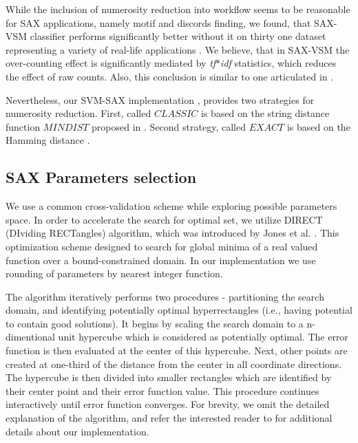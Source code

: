 \documentclass{llncs}
\begin{document}
While the inclusion of numerosity reduction into workflow seems to be reasonable for SAX
applications, namely motif and discords finding, we found, that SAX-VSM classifier performs
significantly better without it on thirty one dataset representing a variety of real-life
applications \cite{jmotif}.
We believe, that in SAX-VSM the over-counting effect is significantly mediated by
\textit{tf$\ast$idf} statistics, which reduces the effect of raw counts. Also, this conclusion is
similar to one articulated in \cite{bag_patterns}.

Nevertheless, our SVM-SAX implementation \cite{jmotif}, provides two strategies for numerosity
reduction. First, called $CLASSIC$ is based on the string distance function $MINDIST$ proposed
in \cite{streaming_sax}. Second strategy, called $EXACT$ is based on the Hamming distance
\cite{hamming}. 

\subsection{SAX Parameters selection} \label{section-direct}
We use a common cross-validation scheme while exploring possible parameters space. 
In order to accelerate the search for optimal set, 
we utilize DIRECT (DIviding RECTangles) algorithm, which 
was introduced by Jones et al. \cite{direct-original}. This optimization scheme 
designed to search for global minima of a real valued function over a bound-constrained domain. 
In our implementation we use rounding of parameters by nearest integer function.

The algorithm iteratively performs two procedures - partitioning the search domain, 
and identifying potentially optimal hyperrectangles (i.e., having potential to contain good solutions). 
It begins by scaling the search domain to a n-dimentional unit hypercube which is considered 
as potentially optimal. The error function is then evaluated at the center of this hypercube. Next, 
other points are created at one-third of the distance from the center in all coordinate directions. 
The hypercube is then divided into smaller rectangles which are identified by their center point 
and their error function value. This procedure continues interactively until error function converges.
For brevity, we omit the detailed explanation of the algorithm, and refer the 
interested reader to \cite{direct} for additional details about our implementation.
\end{document}
